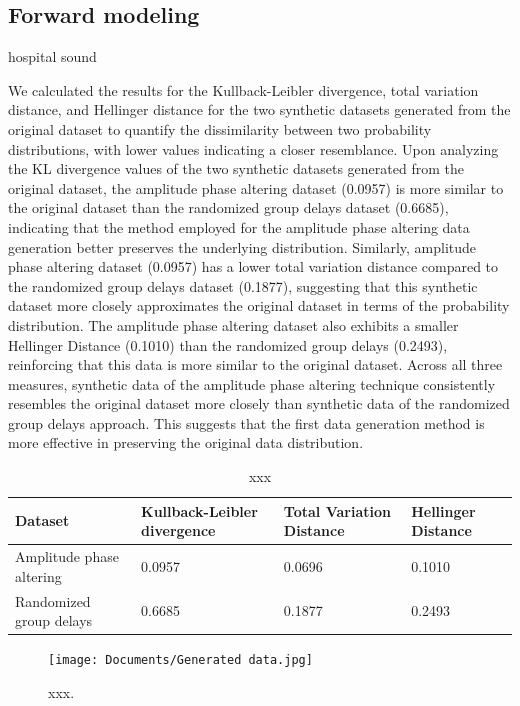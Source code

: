 \documentclass{article}
\begin{document}
\subsection{Forward modeling}
hospital sound



We calculated the results for the Kullback-Leibler divergence, total variation distance, and Hellinger distance for the two synthetic datasets generated from the original dataset to quantify the dissimilarity between two probability distributions, with lower values indicating a closer resemblance. Upon analyzing the KL divergence values of the two synthetic datasets generated from the original dataset, the amplitude phase altering dataset (0.0957) is more similar to the original dataset than the randomized group delays dataset (0.6685), indicating that the method employed for the amplitude phase altering data generation better preserves the underlying distribution. Similarly, amplitude phase altering dataset (0.0957) has a lower total variation distance compared to the randomized group delays dataset (0.1877), suggesting that this synthetic dataset more closely approximates the original dataset in terms of the probability distribution. The amplitude phase altering dataset also exhibits a smaller Hellinger Distance (0.1010) than the randomized group delays (0.2493), reinforcing that this data is more similar to the original dataset. Across all three measures, synthetic data of the amplitude phase altering technique consistently resembles the original dataset more closely than synthetic data of the randomized group delays approach. This suggests that the first data generation method  is more effective in preserving the original data distribution.

\begin{table}
\centering
\caption{xxx}
\begin{tabular}{|l|l|l|l|}
\hline
Dataset                  & Kullback-Leibler divergence                & Total Variation Distance & Hellinger Distance \\ \hline
Amplitude phase altering & 0.0957                                     & 0.0696                   & 0.1010             \\ \hline
Randomized group delays   & 0.6685  & 0.1877                   & 0.2493  \\ \hline           
\end{tabular}
\end{table}

\begin{figure}
\centering
    \texttt{[image: Documents/Generated data.jpg]}
    \caption{xxx.}
    \label{tab:GD}

\end{figure}
\end{document}
